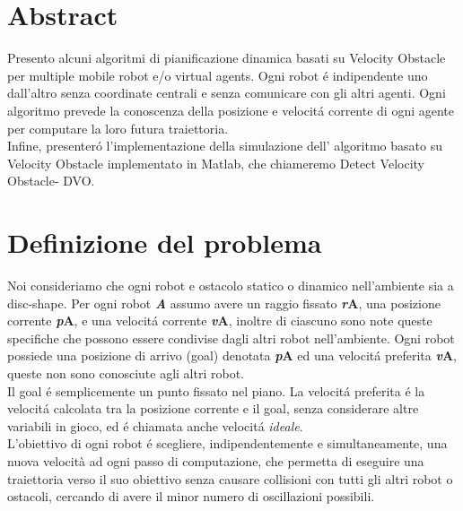
\cleardoublepage
{}
{}
\begingroup
\let\clearpage\relax
\let\cleardoublepage\relax
\let\cleardoublepage\relax


\chapter*{Abstract}

Presento alcuni algoritmi di pianificazione dinamica basati su Velocity Obstacle per multiple mobile robot e/o virtual agents. 
Ogni robot \'e indipendente uno dall'altro senza coordinate centrali e senza comunicare con gli altri agenti.
Ogni algoritmo prevede la conoscenza della posizione e velocit\'a corrente di ogni agente per computare la loro futura traiettoria. 
\\Infine, presenter\'o l'implementazione della simulazione dell' algoritmo basato su Velocity Obstacle implementato in Matlab, che chiameremo Detect Velocity Obstacle- DVO.


\chapter*{Definizione del problema}
Noi consideriamo che ogni robot e ostacolo statico o dinamico nell'ambiente sia a disc-shape. 
Per ogni robot {\bfseries\textit{A}} assumo avere un raggio fissato {\bfseries\textit{r}\ped A}, una posizione corrente {\bfseries\textit{p}\ped A}, e una velocit\'a corrente {\bfseries\textit{v}\ped A}, inoltre di ciascuno sono note queste specifiche che possono essere condivise dagli altri robot nell'ambiente. Ogni robot possiede una posizione di arrivo (goal) denotata {\bfseries\textit{p}\ped A} ed una velocit\'a preferita {\bfseries\textit{v}\ped A}, queste non sono conosciute agli altri robot.
\\Il goal \'e semplicemente un punto fissato nel piano. La velocit\'a preferita \'e la velocit\'a calcolata tra la posizione corrente e il goal, senza considerare altre variabili in gioco, ed \'e chiamata anche velocit\'a \textit{ideale}.
\\L'obiettivo di ogni robot \'e scegliere, indipendentemente e simultaneamente, una nuova velocità ad ogni passo di computazione, che permetta di eseguire una traiettoria verso il suo obiettivo senza causare collisioni con
tutti gli altri robot o ostacoli, cercando di avere il minor numero di oscillazioni
possibili.
\vfill
{}

\endgroup			

\vfill

